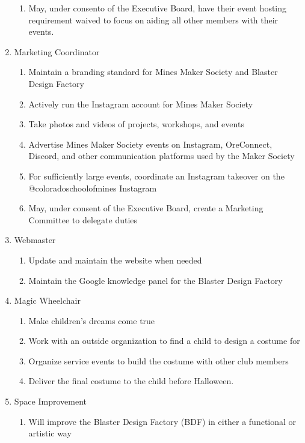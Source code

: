 \documentclass[12pt,letterpaper]{article}
\begin{document}
\begin{enumerate}
\begin{enumerate}
        \item May, under consento of the Executive Board, have their event hosting requirement waived to focus on aiding all other members with their events.
    \end{enumerate}
    \item Marketing Coordinator 
    \begin{enumerate}
        \item Maintain a branding standard for Mines Maker Society and Blaster Design Factory
        \item Actively run the Instagram account for Mines Maker Society
        \item Take photos and videos of projects, workshops, and events
        \item Advertise Mines Maker Society events on Instagram, OreConnect, Discord, and other communication platforms used by the Maker Society
        \item For sufficiently large events, coordinate an Instagram takeover on the @coloradoschoolofmines Instagram
        \item May, under consent of the Executive Board, create a Marketing Committee to delegate duties
    \end{enumerate}
    \item Webmaster 
    \begin{enumerate}
        \item Update and maintain the website when needed
        \item Maintain the Google knowledge panel for the Blaster Design Factory
    \end{enumerate}
    \item Magic Wheelchair 
    \begin{enumerate}
        \item Make children’s dreams come true
        \item Work with an outside organization to find a child to design a costume for
        \item Organize service events to build the costume with other club members 
        \item Deliver the final costume to the child before Halloween.
    \end{enumerate}
    \item Space Improvement 
    \begin{enumerate}
        \item Will improve the Blaster Design Factory (BDF) in either a functional or artistic way

\end{enumerate}
\end{enumerate}
\end{document}
